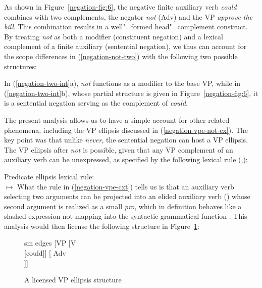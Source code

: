 \documentclass[output=paper
                ,modfonts
                ,nonflat
	        ,collection
	        ,collectionchapter
	        ,collectiontoclongg
 	        ,biblatex
                ,babelshorthands
                ,newtxmath
                ,draftmode
                ,colorlinks, citecolor=brown
]{./langsci/langscibook}
\begin{document}
{\begin{exe}
\begin{xlist}
\begin{exe}
\begin{xlist}
As shown in Figure~\ref{negation-fig:6}, the negative finite auxiliary
verb \textit{could} combines with two complements, the negator
\textit{not} (Adv) and the VP \textit{approve the bill}.
This combination results in a well"=formed head"=complement construct.
By treating \textit{not} as both a modifier (constituent negation)
and a lexical complement of a finite auxiliary (sentential negation), we thus can
account for the scope differences in (\ref{negation-not-two}) with the
following two possible structures:

\eal
\label{negation-two-int}
\zl
%
In (\ref{negation-two-int}a), \textit{not} functions as a modifier to
the base VP, while  in (\ref{negation-two-int}b), whose partial structure is
given in Figure~\ref{negation-fig:6}, it is a sentential
negation serving as the complement of \emph{could}.

The present analysis allows us to have a simple account for other related phenomena,
including the VP ellipsis discussed in (\ref{negation-vpe-not-ex}). The key point
was that unlike \textit{never}, the sentential negation can
host a VP ellipsis.  The VP ellipsis after \textit{not} is
possible, given that any VP complement of an auxiliary
verb can be unexpressed, as
specified by the following lexical rule (\citealt{Kim:00},\citealt[]{kimmichaelis:2020}):


\ea
\label{negation-vpe-cxt}
Predicate ellipsis lexical rule:\\
  $\mapsto$
\z
%
%
What the rule in (\ref{negation-vpe-cxt}) tells us is that an auxiliary verb selecting two arguments
can be projected into an elided auxiliary verb () whose second argument
is realized as a small \emph{pro}, which in definition
behaves like a slashed expression not mapping into the syntactic grammatical
 function \COMPS. This analysis would then license
the following structure in Figure~\ref{negation-could-not}:
%
%
%
%
\begin{figure}
	\begin{forest}
		sm edges
		[VP
			[V\\
					[could]]
			[ Adv\\
					[not]]]
	\end{forest}
\caption{A licensed VP ellipsis structure}\label{negation-could-not}
\end{figure}


\end{xlist}
\end{exe}
\end{xlist}
\end{exe}}
\end{document}
